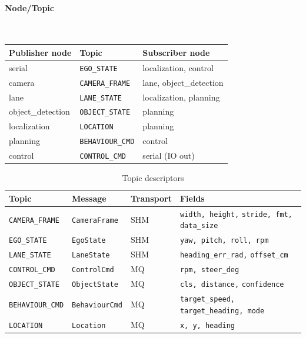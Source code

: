 \documentclass[12pt,a4paper]{article}
\begin{document}
\paragraph{Node/Topic}~

\begin{center}
\begin{tabular}{lll}
\hline
\textbf{Publisher node} & \textbf{Topic} & \textbf{Subscriber node} \\
\hline
serial            & \texttt{EGO\_STATE}     & localization, control \\
camera            & \texttt{CAMERA\_FRAME}  & lane, object\_detection \\
lane              & \texttt{LANE\_STATE}    & localization, planning \\
object\_detection & \texttt{OBJECT\_STATE}  & planning \\
localization      & \texttt{LOCATION}       & planning \\
planning          & \texttt{BEHAVIOUR\_CMD} & control \\
control           & \texttt{CONTROL\_CMD}   & serial (IO out) \\
\hline
\end{tabular}
\end{center}

\begin{table}[H]
\centering
\begin{tabular}{lllp{5cm}}
\hline
\textbf{Topic} & \textbf{Message} & \textbf{Transport} & \textbf{Fields} \\
\hline
\texttt{CAMERA\_FRAME}
  & \texttt{CameraFrame} & SHM
  & \texttt{width, height,} \newline \texttt{stride, fmt, data\_size} \\
\texttt{EGO\_STATE}
  & \texttt{EgoState}    & SHM
  & \texttt{yaw, pitch, roll, rpm} \\
\texttt{LANE\_STATE}
  & \texttt{LaneState}   & SHM
  & \texttt{heading\_err\_rad,} \newline \texttt{offset\_cm} \\
\texttt{CONTROL\_CMD}
  & \texttt{ControlCmd}  & MQ
  & \texttt{rpm, steer\_deg} \\
\texttt{OBJECT\_STATE}
  & \texttt{ObjectState} & MQ
  & \texttt{cls, distance,} \newline \texttt{confidence} \\
\texttt{BEHAVIOUR\_CMD}
  & \texttt{BehaviourCmd} & MQ
  & \texttt{target\_speed,} \newline \texttt{target\_heading, mode} \\
\texttt{LOCATION}
  & \texttt{Location}    & MQ
  & \texttt{x, y, heading} \\
\hline
\end{tabular}
\caption{Topic descriptors}
\end{table}
\end{document}
